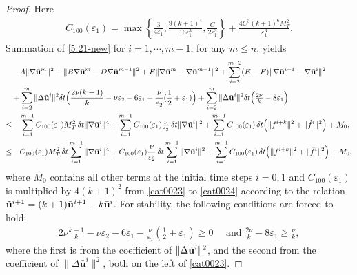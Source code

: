 \documentclass{article}
\theoremstyle{definition}                   %
\begin{document}
\begin{proof}
Here 
\begin{align}
C_{100}(\varepsilon_1)=\max\left\{ \frac{3}{4\varepsilon_1}, \frac{9 (k+1)^4}{16 \varepsilon_1^3}, \frac{C}{2\varepsilon_1^3} \right\} +  \frac{4C^3(k+1)^6 M_T^2}{\varepsilon_1^3}.
\label{cat0027}
\end{align}
%
Summation of \eqref{5.21-new} for $i=1,\cdots,  m-1$, for any $m\le n$,  yields
\begin{align}
& \quad A \|\nabla \bar{\bf u}^m\|^2 
+ \| B \nabla \bar{\bf u}^m - D \nabla\bar{\bf u}^{m-1}\|^2 
+ E \|\nabla \bar{\bf u}^m - \nabla \bar{\bf u}^{m-1}\|^2 
 + \sum^{m-2}_{i=2} (E-F) \|\nabla \bar{\bf u}^{i+1} - \nabla \bar{\bf u}^{i}\|^2 \notag \\
&  + \sum_{i=2}^{m} \|\Delta \tilde{\bf u}^i\|^2 \delta t \Big( \frac{2\nu (k-1)}{k} - \nu \varepsilon_2 -  6\varepsilon_1  - \frac{\nu}{\varepsilon_2} (\frac{1}{2}+\varepsilon_1) \Big) 
+ \sum_{i=2}^{m} \|\Delta \bar{\bf u}^i\|^2 \delta t \Big( \tfrac{2\nu}{k} - 8\varepsilon_1 \Big) 
 \notag \\
\leq & \quad \sum_{i=1}^{m-1} C_{100}(\varepsilon_1) M_T^2 \,\delta t \|\nabla \bar{\bf u}^i\|^4 
+ \sum_{i=1}^{m-1} C_{100}(\varepsilon_1) \tfrac{\nu}{\varepsilon_2}\,\delta t \|\nabla \tilde{\bf u}^{i}\|^2 + \sum_{i=1}^{m-1} C_{100}(\varepsilon_1) \,\delta t \Big(\|f^{i+k}\|^2 + \|\hat{f}^{i}\|^2\Big) 
+ M_0,
\label{cat0023} \\
\leq & \quad C_{100}(\varepsilon_1) M_T^2 \,\delta t \sum_{i=1}^{m-1}  \|\nabla \bar{\bf u}^i\|^4 
+ C_{100}(\varepsilon_1) \frac{\nu}{\varepsilon_2}\,\delta t \sum_{i=1}^{m-1}  \|\nabla \bar{\bf u}^{i}\|^2 + \sum_{i=1}^{m-1} C_{100}(\varepsilon_1) \,\delta t \Big(\|f^{i+k}\|^2 + \|\hat{f}^{i}\|^2\Big) 
+ M_0,
\label{cat0024} 
\end{align}
where $M_0$ contains all other terms at the initial time steps $i=0,1$ and  $C_{100}(\varepsilon_1)$ is multiplied by $4(k+1)^2$ from \eqref{cat0023} to \eqref{cat0024} according to the relation 
$\tilde{\bf u}^{i+1}=(k+1) {\bar{\bf u}}^{i+1} - k {\bar{\bf u}}^i$.
%
For stability, the following conditions are forced to hold:
\begin{align}
2\nu\frac{k-1}{k} - \nu\varepsilon_2 - 6 \varepsilon_1 - \frac{\nu}{\varepsilon_2} \left(\frac{1}{2} + \varepsilon_1\right) \ge 0
\quad \text{ and }
\frac{2\nu}{k} -8\varepsilon_1\ge \frac{\nu}{k},
\label{5.22-new}
\end{align}
where the first is from the coefficient of 
$\| \Delta\tilde{\bf u}^{i}\|^2$, and the second from  the coefficient of $\|\Delta\bar{\mathbf{u}}^{i}\|^2$, both on the left of \eqref{cat0023}. 

\end{proof}
\end{document}
